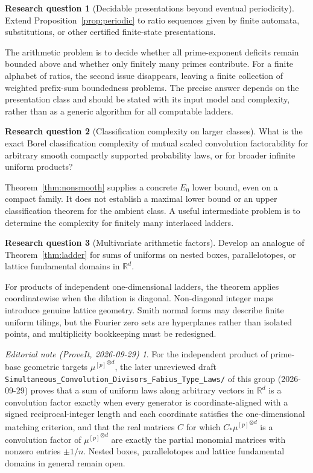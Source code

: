 \documentclass[11pt,a4paper]{article}
\theoremstyle{definition}
\newtheorem{question}{Research question}
\theoremstyle{remark}
\newtheorem*{ednote}{Editorial note (ProveIt, 2026-09-29)}
\newcommand{\R}{\mathbb R}
\newcommand{\Mu}[1]{\mu^{[#1]}}
\begin{document}
\begin{question}[Decidable presentations beyond eventual periodicity]
Extend Proposition~\ref{prop:periodic} to ratio sequences given by finite
automata, substitutions, or other certified finite-state presentations.
\end{question}
The arithmetic problem is to decide whether all prime-exponent deficits
remain bounded above and whether only finitely many primes contribute.
For a finite alphabet of ratios, the second issue disappears, leaving a
finite collection of weighted prefix-sum boundedness problems. The precise
answer depends on the presentation class and should be stated with its
input model and complexity, rather than as a generic algorithm for all
computable ladders.

\begin{question}[Classification complexity on larger classes]
What is the exact Borel classification complexity of mutual scaled
convolution factorability for arbitrary smooth compactly supported
probability laws, or for broader infinite uniform products?
\end{question}
Theorem~\ref{thm:nonsmooth} supplies a concrete $E_0$ lower bound, even on a
compact family. It does not establish a maximal lower bound or an upper
classification theorem for the ambient class. A useful intermediate
problem is to determine the complexity for finitely many interlaced ladders.

\begin{question}[Multivariate arithmetic factors]
Develop an analogue of Theorem~\ref{thm:ladder} for sums of uniforms on
nested boxes, parallelotopes, or lattice fundamental domains in $\R^d$.
\end{question}
For products of independent one-dimensional ladders, the theorem applies
coordinatewise when the dilation is diagonal. Non-diagonal integer maps
introduce genuine lattice geometry. Smith normal forms may describe finite
uniform tilings, but the Fourier zero sets are hyperplanes rather than
isolated points, and multiplicity bookkeeping must be redesigned.

\begin{ednote}
For the independent product of prime-base geometric targets
${\Mu{p}}^{\otimes d}$, the later unreviewed draft
\nolinkurl{Simultaneous_Convolution_Divisors_Fabius_Type_Laws/} of this
group (2026-09-29) proves that a sum of uniform laws along arbitrary
vectors in $\R^d$ is a convolution factor exactly when every generator is
coordinate-aligned with a signed reciprocal-integer length and each
coordinate satisfies the one-dimensional matching criterion, and that the
real matrices $C$ for which $C_*{\Mu{p}}^{\otimes d}$ is a convolution factor
of ${\Mu{p}}^{\otimes d}$ are exactly the partial monomial matrices with
nonzero entries $\pm1/n$. Nested boxes, parallelotopes and lattice
fundamental domains in general remain open.
\end{ednote}
\end{document}
